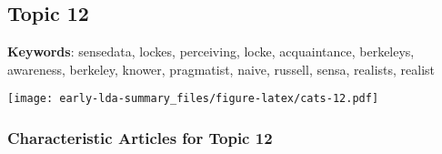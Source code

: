 \documentclass[
]{article}
\begin{document}
\newpage

\hypertarget{topic-12}{%
\subsection{Topic 12}\label{topic-12}}

\textbf{Keywords}: sensedata, lockes, perceiving, locke, acquaintance,
berkeleys, awareness, berkeley, knower, pragmatist, naive, russell,
sensa, realists, realist

\texttt{[image: early-lda-summary\_files/figure-latex/cats-12.pdf]}
\newpage 

\hypertarget{characteristic-articles-for-topic-12}{%
\subsubsection{Characteristic Articles for Topic
12}\label{characteristic-articles-for-topic-12}}
\end{document}
